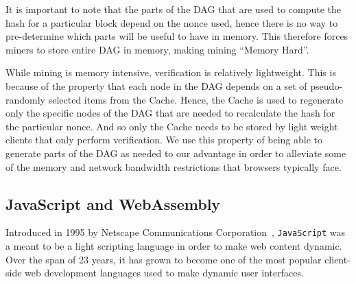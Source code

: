 \documentclass[runningheads]{llncs}
\begin{document}
It is important to note that the parts of the DAG that are used to compute the hash for a particular block depend on the nonce used, hence there is no way to pre-determine which parts will be useful to have in memory. This therefore forces miners to store entire DAG in memory, making mining ``Memory Hard''. 


While mining is memory intensive, verification is relatively lightweight. This is because of the property that each node in the DAG depends on a set of pseudo-randomly selected items from the Cache. Hence, the Cache is used to regenerate only the specific nodes of the DAG that are needed to recalculate the hash for the particular nonce. And so only the Cache needs to be stored by light weight clients that only perform verification. We use this property of being able to generate parts of the DAG as needed to our advantage in order to alleviate some of the memory and network bandwidth restrictions that browsers typically face.



\subsection{JavaScript and WebAssembly}
Introduced in 1995 by Netscape Communications Corporation~\cite{https://auth0.com/blog/a-brief-history-of-javascript/}, \verb|JavaScript| was a meant to be a light scripting language in order to  make web content dynamic. Over the span of 23 years, it has grown to become one of the most popular client-side web development languages used to make dynamic user interfaces. 
\end{document}
